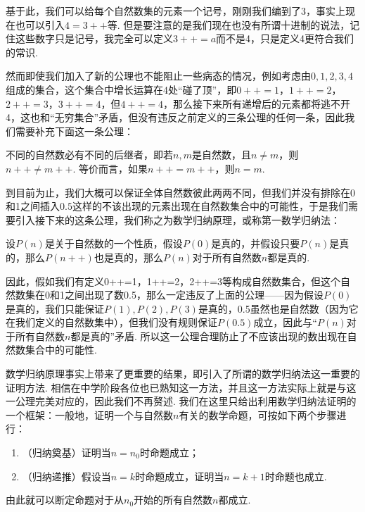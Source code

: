 基于此，我们可以给每个自然数集的元素一个记号，刚刚我们编到了3，事实上现在也可以引入$4=3++$等. 但是要注意的是我们现在也没有所谓十进制的说法，记住这些数字只是记号，我完全可以定义$3++=a$而不是4，只是定义4更符合我们的常识.

然而即使我们加入了新的公理也不能阻止一些病态的情况，例如考虑由$0,1,2,3,4$组成的集合，这个集合中增长运算在4处``碰了顶''，即$0++=1$，$1++=2$，$2++=3$，$3++=4$，但$4++=4$，那么接下来所有递增后的元素都将逃不开4，这也和``无穷集合''矛盾，但没有违反之前定义的三条公理的任何一条，因此我们需要补充下面这一条公理：

\begin{axiom}
    不同的自然数必有不同的后继者，即若$n,m$是自然数，且$n\neq m$，则$n++\neq m++$. 等价而言，如果$n++=m++$，则$n=m$.
\end{axiom}

到目前为止，我们大概可以保证全体自然数彼此两两不同，但我们并没有排除在0和1之间插入$0.5$这样的不该出现的元素出现在自然数集合中的可能性，于是我们需要引入接下来的这条公理，我们称之为数学归纳原理，或称第一数学归纳法：

\begin{axiom}%
    设$P(n)$是关于自然数的一个性质，假设$P(0)$是真的，并假设只要$P(n)$是真的，那么$P(n++)$也是真的，那么$P(n)$对于所有自然数$n$都是真的.
\end{axiom}

因此，假如我们有定义0++=1，1++=2，2++=3等构成自然数集合，但这个自然数集在0和1之间出现了数0.5，那么一定违反了上面的公理——因为假设$P(0)$是真的，我们只能保证$P(1),P(2),P(3)$是真的，0.5虽然也是自然数（因为它在我们定义的自然数集中），但我们没有规则保证$P(0.5)$成立，因此与``$P(n)$对于所有自然数$n$都是真的''矛盾. 所以这一公理合理防止了不应该出现的数出现在自然数集合中的可能性.

数学归纳原理事实上带来了更重要的结果，即引入了所谓的数学归纳法这一重要的证明方法. 相信在中学阶段各位也已熟知这一方法，并且这一方法实际上就是与这一公理完美对应的，因此我们不再赘述. 我们在这里只给出利用数学归纳法证明的一个框架：一般地，证明一个与自然数$n$有关的数学命题，可按如下两个步骤进行：
\begin{enumerate}
    \item（归纳奠基）证明当$n=n_0$时命题成立；

    \item（归纳递推）假设当$n=k$时命题成立，证明当$n=k+1$时命题也成立.
\end{enumerate}
由此就可以断定命题对于从$n_0$开始的所有自然数$n$都成立.

